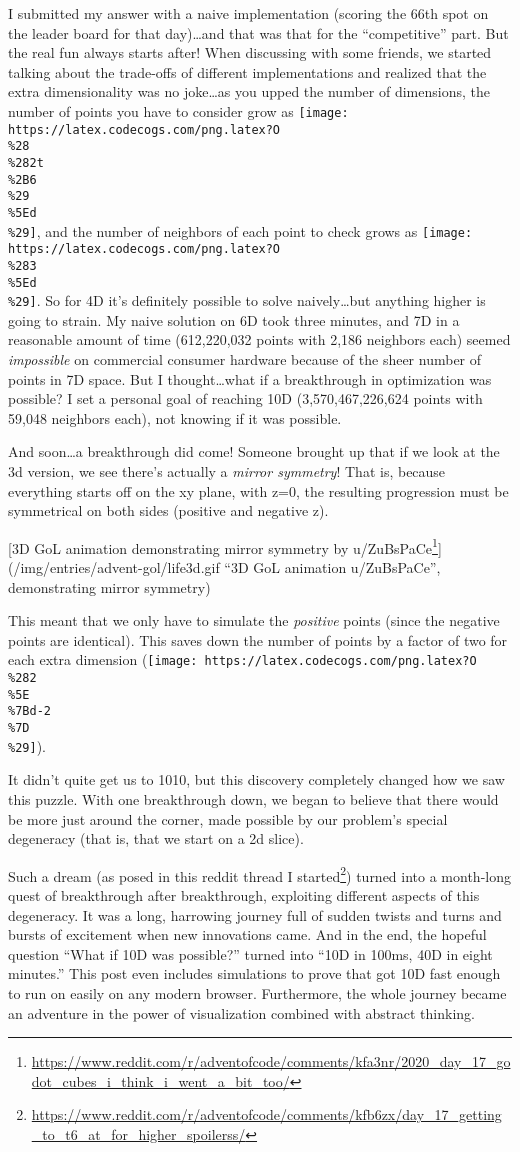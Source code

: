 \documentclass[]{article}
\renewcommand{\href}[2]{#2\footnote{\url{#1}}}
\begin{document}
I submitted my answer with a naive implementation (scoring the 66th spot on the
leader board for that day)\ldots and that was that for the ``competitive'' part.
But the real fun always starts after! When discussing with some friends, we
started talking about the trade-offs of different implementations and realized
that the extra dimensionality was no joke\ldots as you upped the number of
dimensions, the number of points you have to consider grow as
\texttt{[image: https://latex.codecogs.com/png.latex?O\\\%28\\\%282t\\\%2B6\\\%29\\\%5Ed\\\%29]},
and the number of neighbors of each point to check grows as
\texttt{[image: https://latex.codecogs.com/png.latex?O\\\%283\\\%5Ed\\\%29]}. So for
4D it's definitely possible to solve naively\ldots but anything higher is going
to strain. My naive solution on 6D took three minutes, and 7D in a reasonable
amount of time (612,220,032 points with 2,186 neighbors each) seemed
\emph{impossible} on commercial consumer hardware because of the sheer number of
points in 7D space. But I thought\ldots what if a breakthrough in optimization
was possible? I set a personal goal of reaching 10D (3,570,467,226,624 points
with 59,048 neighbors each), not knowing if it was possible.

And soon\ldots a breakthrough did come! Someone brought up that if we look at
the 3d version, we see there's actually a \emph{mirror symmetry}! That is,
because everything starts off on the xy plane, with z=0, the resulting
progression must be symmetrical on both sides (positive and negative z).

{[}3D GoL animation demonstrating mirror symmetry by
\href{https://www.reddit.com/r/adventofcode/comments/kfa3nr/2020_day_17_godot_cubes_i_think_i_went_a_bit_too/}{u/ZuBsPaCe}{]}(/img/entries/advent-gol/life3d.gif
``3D GoL animation u/ZuBsPaCe'', demonstrating mirror symmetry)

This meant that we only have to simulate the \emph{positive} points (since the
negative points are identical). This saves down the number of points by a factor
of two for each extra dimension
(\texttt{[image: https://latex.codecogs.com/png.latex?O\\\%282\\\%5E\\\%7Bd-2\\\%7D\\\%29]}).

It didn't quite get us to 1010, but this discovery completely changed how we saw
this puzzle. With one breakthrough down, we began to believe that there would be
more just around the corner, made possible by our problem's special degeneracy
(that is, that we start on a 2d slice).

Such a dream (as posed in
\href{https://www.reddit.com/r/adventofcode/comments/kfb6zx/day_17_getting_to_t6_at_for_higher_spoilerss/}{this
reddit thread I started}) turned into a month-long quest of breakthrough after
breakthrough, exploiting different aspects of this degeneracy. It was a long,
harrowing journey full of sudden twists and turns and bursts of excitement when
new innovations came. And in the end, the hopeful question ``What if 10D was
possible?'' turned into ``10D in 100ms, 40D in eight minutes.'' This post even
includes simulations to prove that got 10D fast enough to run on easily on any
modern browser. Furthermore, the whole journey became an adventure in the power
of visualization combined with abstract thinking.
\end{document}
